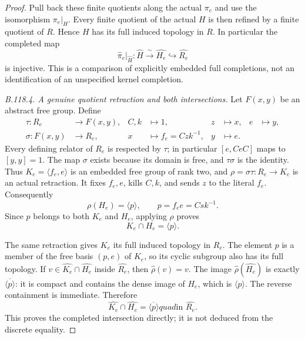\begin{proof}
Pull back these finite quotients along the actual $\pi_e$ and use
the isomorphism $\pi_e|_H$. Every finite quotient of the actual $H$
is then refined by a finite quotient of $R$. Hence $H$ has its full
induced topology in $R$. In particular the completed map
\begin{equation}\label{eq:B118-completed-base-map}
 \widehat\pi_e|_{\widehat H}:
       \widehat H\xrightarrow{\ \sim\ }\widehat{H_e}
          \hookrightarrow\widehat{R_e}
\end{equation}
is injective. This is a comparison of explicitly embedded full
completions, not an identification of an unspecified kernel completion.

\emph{B.118.4. A genuine quotient retraction and both intersections.}
Let $F(x,y)$ be an abstract free group. Define
\begin{equation}\label{eq:B118-quotient-retraction}
 \begin{aligned}
 \tau:R_e&\longrightarrow F(x,y),
   &C,k&\longmapsto1,&z&\longmapsto x,&e&\longmapsto y,\\
 \sigma:F(x,y)&\longrightarrow R_e,
   &x&\longmapsto f_e=Czk^{-1},&y&\longmapsto e.
 \end{aligned}
\end{equation}
Every defining relator of $R_e$ is respected by $\tau$; in
particular $[e,CeC]$ maps to $[y,y]=1$. The map $\sigma$ exists
because its domain is free, and $\tau\sigma$ is the identity.
Thus $K_e=\langle f_e,e\rangle$ is an embedded free group of rank
two, and $\rho=\sigma\tau:R_e\to K_e$ is an actual retraction.
It fixes $f_e,e$, kills $C,k$, and sends $z$ to the literal $f_e$.
Consequently
\begin{equation}\label{eq:B118-retraction-image}
 \rho(H_e)=\langle p\rangle,\qquad p=f_e e=Csk^{-1}.
\end{equation}
Since $p$ belongs to both $K_e$ and $H_e$, applying $\rho$ proves
\[
 K_e\cap H_e=\langle p\rangle.
\]

The same retraction gives $K_e$ its full induced topology in $R_e$.
The element $p$ is a member of the free basis $(p,e)$ of $K_e$,
so its cyclic subgroup also has its full topology. If
$v\in\widehat{K_e}\cap\widehat{H_e}$ inside $\widehat{R_e}$,
then $\widehat\rho(v)=v$. The image
$\widehat\rho(\widehat{H_e})$ is exactly
$\overline{\langle p\rangle}$: it is compact and contains the
dense image of $H_e$, which is $\langle p\rangle$.
The reverse containment is immediate. Therefore
\begin{equation}\label{eq:B118-quotient-completed-intersection}
 \widehat{K_e}\cap\widehat{H_e}
       =\overline{\langle p\rangle}quad\text{in }\widehat{R_e}.
\end{equation}
This proves the completed intersection directly; it is not deduced
from the discrete equality.


\end{proof}
